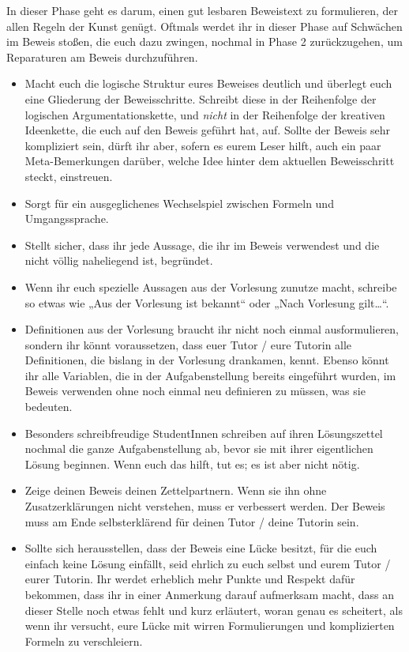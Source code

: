 
 \begin{de}
 In dieser Phase geht es darum, einen gut lesbaren Beweistext zu formulieren, der allen Regeln der Kunst genügt. Oftmals werdet ihr in dieser Phase auf Schwächen im Beweis stoßen, die euch dazu zwingen, nochmal in Phase 2 zurückzugehen, um Reparaturen am Beweis durchzuführen.
 \begin{itemize}
  \item Macht euch die logische Struktur eures Beweises deutlich und überlegt euch eine Gliederung der Beweisschritte. Schreibt diese in der Reihenfolge der logischen Argumentationskette, und \emph{nicht} in der Reihenfolge der kreativen Ideenkette, die euch auf den Beweis geführt hat, auf. Sollte der Beweis sehr kompliziert sein, dürft ihr aber, sofern es eurem Leser hilft, auch ein paar Meta-Bemerkungen darüber, welche Idee hinter dem aktuellen Beweisschritt steckt, einstreuen.
  \item Sorgt für ein ausgeglichenes Wechselspiel zwischen Formeln und Umgangssprache.
  \item Stellt sicher, dass ihr jede Aussage, die ihr im Beweis verwendest und die nicht völlig naheliegend ist, begründet.
\item Wenn ihr euch spezielle Aussagen aus der Vorlesung zunutze macht, schreibe so etwas wie „Aus der Vorlesung ist bekannt“ oder „Nach Vorlesung gilt\dots“.
  \item Definitionen aus der Vorlesung braucht ihr nicht noch einmal ausformulieren, sondern ihr könnt voraussetzen, dass euer Tutor / eure Tutorin alle Definitionen, die bislang in der Vorlesung drankamen, kennt. Ebenso könnt ihr alle Variablen, die in der Aufgabenstellung bereits eingeführt wurden, im Beweis verwenden ohne noch einmal neu definieren zu müssen, was sie bedeuten.
  \item Besonders schreibfreudige StudentInnen schreiben auf ihren Lösungszettel nochmal die ganze Aufgabenstellung ab, bevor sie mit ihrer eigentlichen Lösung beginnen. Wenn euch das hilft, tut es; es ist aber nicht nötig.
  \item Zeige deinen Beweis deinen Zettelpartnern. Wenn sie ihn ohne Zusatzerklärungen nicht verstehen, muss er verbessert werden. Der Beweis muss am Ende selbsterklärend für deinen Tutor / deine Tutorin sein.
  \item Sollte sich herausstellen, dass der Beweis eine Lücke besitzt, für die euch einfach keine Lösung einfällt, seid ehrlich zu euch selbst und eurem Tutor / eurer Tutorin. Ihr werdet erheblich mehr Punkte und Respekt dafür bekommen, dass ihr in einer Anmerkung darauf aufmerksam macht, dass an dieser Stelle noch etwas fehlt und kurz erläutert, woran genau es scheitert, als wenn ihr versucht, eure Lücke mit wirren Formulierungen und komplizierten Formeln zu verschleiern.

\end{itemize}
\end{de}
